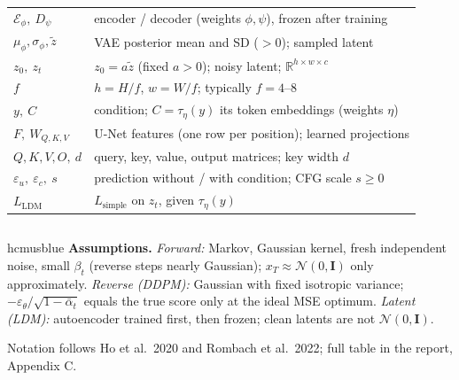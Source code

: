 \documentclass[aspectratio=169,9pt,xcolor=table]{beamer}
\newcommand{\R}{\mathbb{R}}
\newcommand{\Normal}{\mathcal{N}}
\newcommand{\Id}{\mathbf{I}}
\newcommand{\eps}{\varepsilon}
\newcommand{\ab}{\bar{\alpha}}
\newcommand{\src}[1]{\par\vfill{\color{muted}\fontsize{6.2}{7.4}\selectfont #1\par}}
\begin{document}
\begin{frame}
\begin{columns}[T,onlytextwidth]
\begin{tabularx}{\linewidth}{@{}>{\raggedright\arraybackslash}p{1.62cm}Y@{}}
\midrule
$\mathcal E_\phi,\ D_\psi$ & encoder / decoder (weights $\phi,\psi$), frozen after training\\
$\mu_\phi,\sigma_\phi,\tilde z$ & VAE posterior mean and SD ($>0$); sampled latent\\
$z_0,\ z_t$ & $z_0=a\tilde z$ (fixed $a>0$); noisy latent; $\R^{h\times w\times c}$\\
$f$ & $h=H/f$, $w=W/f$; typically $f=4$--$8$\\
$y,\ C$ & condition; $C=\tau_\eta(y)$ its token embeddings (weights $\eta$)\\
$F,\ W_{Q,K,V}$ & U-Net features (one row per position); learned projections\\
$Q,K,V,O,\ d$ & query, key, value, output matrices; key width $d$\\
$\eps_u,\ \eps_c,\ s$ & prediction without / with condition; CFG scale $s\ge0$\\
$L_{\text{LDM}}$ & $L_{\text{simple}}$ on $z_t$, given $\tau_\eta(y)$\\
\bottomrule
\end{tabularx}
\end{columns}
\vspace{1mm}
\begin{nbox}[fontupper=\fontsize{6.6}{7.9}\selectfont]{hcmusblue}
\textbf{Assumptions.} \emph{Forward:} Markov, Gaussian kernel, fresh independent noise, small $\beta_t$ (reverse steps nearly Gaussian); $x_T\approx\Normal(0,\Id)$ only approximately.
\emph{Reverse (DDPM):} Gaussian with fixed isotropic variance; $-\eps_\theta/\sqrt{1-\ab_t}$ equals the true score only at the ideal MSE optimum.
\emph{Latent (LDM):} autoencoder trained first, then frozen; clean latents are not $\Normal(0,\Id)$.
\end{nbox}
\src{Notation follows Ho et al.\ 2020 and Rombach et al.\ 2022; full table in the report, Appendix C.}
\end{frame}

\newcommand{\refitem}[1]{\par\noindent\hangindent=1.2em\hangafter=1 \textbullet\ #1\par\vspace{1pt}}
\end{document}
